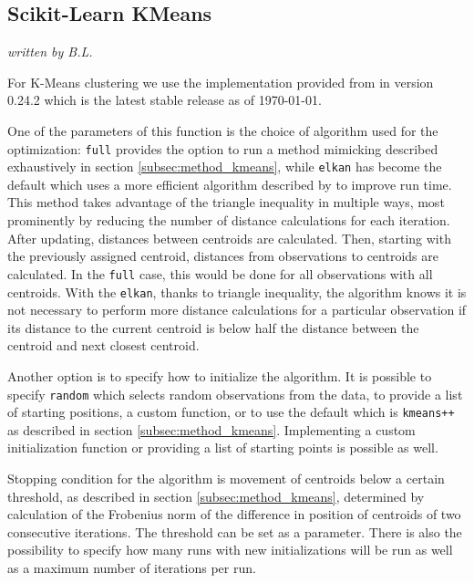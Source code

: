 \subsection{Scikit-Learn KMeans}
\label{subsec:sklearn_kmeans}
\textit{written by B.L.}

For K-Means clustering we use the implementation provided from \cite{sklearn_api} in version 0.24.2 which is the latest stable release as of \today. 

One of the parameters of this function is the choice of algorithm used for the optimization: \texttt{full} provides the option to run a method mimicking \cite{lloyd1982least} described exhaustively in section \ref{subsec:method_kmeans}, while \texttt{elkan} has become the default which uses a more efficient algorithm described by \cite{elkan2003using} to improve run time. This method takes advantage of the triangle inequality in multiple ways, most prominently by reducing the number of distance calculations for each iteration. After updating, distances between centroids are calculated. Then, starting with the previously assigned centroid, distances from observations to centroids are calculated. In the \texttt{full} case, this would be done for all observations with all centroids. With the \texttt{elkan}, thanks to triangle inequality, the algorithm knows it is not necessary to perform more distance calculations for a particular observation if its distance to the current centroid is below half the distance between the centroid and next closest centroid.

Another option is to specify how to initialize the algorithm. It is possible to specify \texttt{random} which selects random observations from the data, to provide a list of starting positions, a custom function, or to use the default which is \texttt{kmeans++} as described in section \ref{subsec:method_kmeans}. Implementing a custom initialization function or providing a list of starting points is possible as well.

Stopping condition for the algorithm is movement of centroids below a certain threshold, as described in section \ref{subsec:method_kmeans}, determined by calculation of the Frobenius norm of the difference in position of centroids of two consecutive iterations. The threshold can be set as a parameter. There is also the possibility to specify how many runs with new initializations will be run as well as a maximum number of iterations per run.

